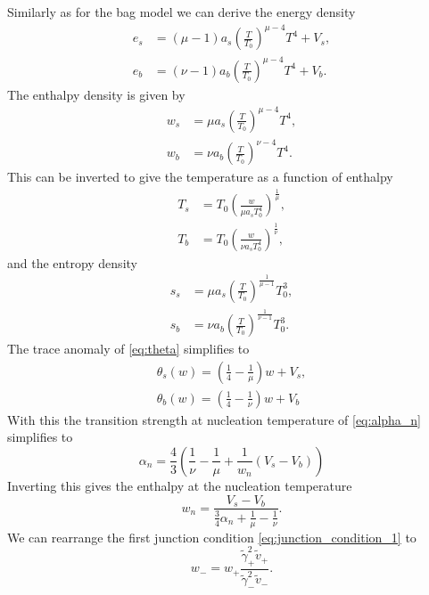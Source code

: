 Similarly as for the bag model we can derive the energy density
\begin{align}
e_s &= (\mu - 1) a_s \left( \frac{T}{T_0} \right)^{\mu-4} T^4 + V_s, \\
e_b &= (\nu - 1) a_b \left( \frac{T}{T_0} \right)^{\mu-4} T^4 + V_b.
\end{align}
The enthalpy density is given by
\begin{align}
w_s &= \mu a_s \left( \frac{T}{T_0} \right)^{\mu-4} T^4, \\
w_b &= \nu a_b \left( \frac{T}{T_0} \right)^{\nu-4} T^4.
\end{align}
This can be inverted to give the temperature as a function of enthalpy
\begin{align}
T_s &= T_0 \left( \frac{w}{\mu a_s T_0^4} \right)^\frac{1}{\mu}, \\
T_b &= T_0 \left( \frac{w}{\nu a_s T_0^4} \right)^\frac{1}{\nu},
\end{align}
and the entropy density
\begin{align}
s_s &= \mu a_s \left( \frac{T}{T_0} \right)^\frac{1}{\mu-1} T_0^3, \\
s_b &= \nu a_b \left( \frac{T}{T_0} \right)^\frac{1}{\nu-1} T_0^3.
\end{align}
The trace anomaly of \eqref{eq:theta} simplifies to
\begin{align}
\theta_s(w) = \left( \frac{1}{4} - \frac{1}{\mu} \right) w + V_s, \\
\theta_b(w) = \left( \frac{1}{4} - \frac{1}{\nu} \right) w + V_b
\end{align}
With this the transition strength at nucleation temperature of \eqref{eq:alpha_n} simplifies to
\begin{equation}
\alpha_n = \frac{4}{3} \left( \frac{1}{\nu} - \frac{1}{\mu} + \frac{1}{w_n} (V_s - V_b) \right)
\end{equation}
Inverting this gives the enthalpy at the nucleation temperature
\begin{equation}
w_n = \frac{V_s - V_b}{ \frac{3}{4} \alpha_n + \frac{1}{\mu} - \frac{1}{\nu} }.
\label{eq:wn_const_cs}
\end{equation}
We can rearrange the first junction condition \eqref{eq:junction_condition_1} to
\begin{equation}
w_- = w_+ \frac{\tilde{\gamma}_+^2 \tilde{v}_+}{\tilde{\gamma}_-^2 \tilde{v}_-}.
\label{eq:wm_const_cs}
\end{equation}

